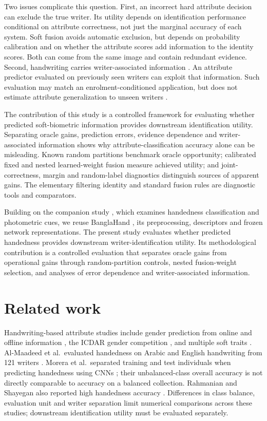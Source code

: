 \documentclass[5p,times,twocolumn,final,numbers,sort&compress]{elsarticle}
\begin{document}
Two issues complicate this question. First, an incorrect hard attribute decision can exclude the true writer. Its utility depends on identification performance conditional on attribute correctness, not just the marginal accuracy of each system. Soft fusion avoids automatic exclusion, but depends on probability calibration and on whether the attribute scores add information to the identity scores. Both can come from the same image and contain redundant evidence. Second, handwriting carries writer-associated information \cite{bulacu2007text,schomaker2007codebooks}. An attribute predictor evaluated on previously seen writers can exploit that information. Such evaluation may match an enrolment-conditioned application, but does not estimate attribute generalization to unseen writers \cite{kaufman2012leakage}.

The contribution of this study is a controlled framework for evaluating whether predicted soft-biometric information provides downstream identification utility. Separating oracle gains, prediction errors, evidence dependence and writer-associated information shows why attribute-classification accuracy alone can be misleading. Known random partitions benchmark oracle opportunity; calibrated fixed and nested learned-weight fusion measure achieved utility; and joint-correctness, margin and random-label diagnostics distinguish sources of apparent gains. The elementary filtering identity and standard fusion rules are diagnostic tools and comparators.

Building on the companion study \cite{prappo2026handedness}, which examines handedness classification and photometric cues, we reuse BanglaHand \cite{banglahand2026data}, its preprocessing, descriptors and frozen network representations. The present study evaluates whether predicted handedness provides downstream writer-identification utility. Its methodological contribution is a controlled evaluation that separates oracle gains from operational gains through random-partition controls, nested fusion-weight selection, and analyses of error dependence and writer-associated information.

\section{Related work}
Handwriting-based attribute studies include gender prediction from online and offline information \cite{liwicki2011gender,siddiqi2015gender}, the ICDAR gender competition \cite{hassaine2013icdar}, and multiple soft traits \cite{bouadjenek2016soft}. Al-Maadeed et al.\ evaluated handedness on Arabic and English handwriting from 121 writers \cite{almaadeed2016handedness}. Morera et al.\ separated training and test individuals when predicting handedness using CNNs \cite{morera2018handedness}; their unbalanced-class overall accuracy is not directly comparable to accuracy on a balanced collection. Rahmanian and Shayegan also reported high handedness accuracy \cite{rahmanian2021handedness}. Differences in class balance, evaluation unit and writer separation limit numerical comparisons across these studies; downstream identification utility must be evaluated separately.
\end{document}
